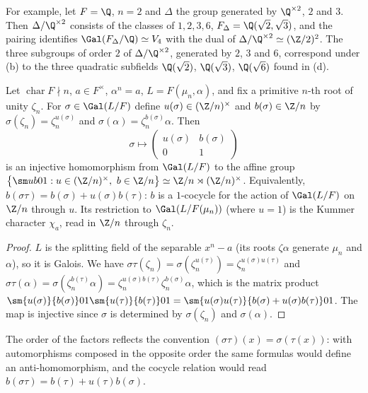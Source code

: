 For example, let $F=\Q$, $n=2$ and $\Delta$ the group generated by $\Q^{\times2}$, $2$ and $3$. Then $\Delta/\Q^{\times2}$ consists of the classes of $1,2,3,6$,
$F_\Delta=\Q(\sqrt2,\sqrt3)$, and the pairing identifies $\Gal(F_\Delta/\Q)\simeq V_4$ with the dual of $\Delta/\Q^{\times2}\simeq(\Z/2)^2$. The three subgroups of
order $2$ of $\Delta/\Q^{\times2}$, generated by $2$, $3$ and $6$, correspond under (b) to the three quadratic subfields $\Q(\sqrt2)$, $\Q(\sqrt3)$, $\Q(\sqrt6)$
found in (d).

\begin{proposition}\label{prop:galois:kummer-affine}
Let $\operatorname{char}F\nmid n$, $a\in F^\times$, $\alpha^n=a$, $L=F(\mu_n,\alpha)$, and fix a primitive $n$-th root of unity $\zeta_n$. For $\sigma\in\Gal(L/F)$
define $u(\sigma)\in(\Z/n)^\times$ and $b(\sigma)\in\Z/n$ by $\sigma(\zeta_n)=\zeta_n^{u(\sigma)}$ and $\sigma(\alpha)=\zeta_n^{b(\sigma)}\alpha$. Then
\[
\sigma\longmapsto\begin{pmatrix}u(\sigma)&b(\sigma)\\0&1\end{pmatrix}
\]
is an injective homomorphism from $\Gal(L/F)$ to the affine group $\bigl\{\sm ub01:u\in(\Z/n)^\times,\ b\in\Z/n\bigr\}\simeq\Z/n\rtimes(\Z/n)^\times$. Equivalently,
$b(\sigma\tau)=b(\sigma)+u(\sigma)b(\tau)$: $b$ is a $1$-cocycle for the action of $\Gal(L/F)$ on $\Z/n$ through $u$. Its restriction to $\Gal(L/F(\mu_n))$ (where
$u=1$) is the Kummer character $\chi_a$, read in $\Z/n$ through $\zeta_n$.
\end{proposition}

\begin{proof}
$L$ is the splitting field of the separable $x^n-a$ (its roots $\zeta\alpha$ generate $\mu_n$ and $\alpha$), so it is Galois. We have
$\sigma\tau(\zeta_n)=\sigma(\zeta_n^{u(\tau)})=\zeta_n^{u(\sigma)u(\tau)}$ and
$\sigma\tau(\alpha)=\sigma(\zeta_n^{b(\tau)}\alpha)=\zeta_n^{u(\sigma)b(\tau)}\zeta_n^{b(\sigma)}\alpha$, which is the matrix product
$\sm{u(\sigma)}{b(\sigma)}01\sm{u(\tau)}{b(\tau)}01=\sm{u(\sigma)u(\tau)}{b(\sigma)+u(\sigma)b(\tau)}01$. The map is injective since $\sigma$ is determined
by $\sigma(\zeta_n)$ and $\sigma(\alpha)$.
\end{proof}

The order of the factors reflects the convention $(\sigma\tau)(x)=\sigma(\tau(x))$: with automorphisms composed in the opposite order the same formulas would define
an anti-homomorphism, and the cocycle relation would read $b(\sigma\tau)=b(\tau)+u(\tau)b(\sigma)$.

